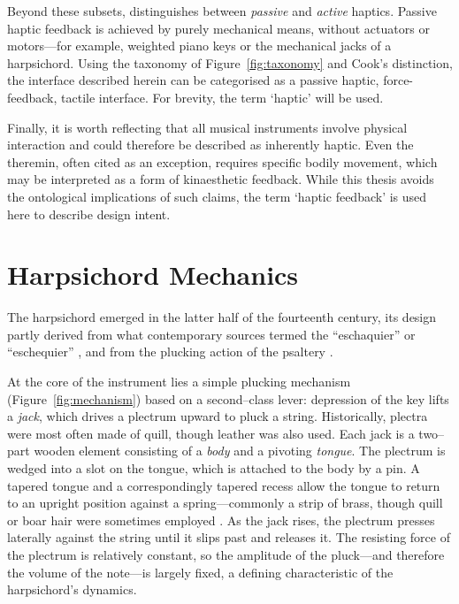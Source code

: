 Beyond these subsets, \textcite{cook_remutualizing_2004} distinguishes between \emph{passive} and \emph{active} haptics. Passive haptic feedback is achieved by purely mechanical means, without actuators or motors---for example, weighted piano keys or the mechanical jacks of a harpsichord. Using the taxonomy of Figure~\ref{fig:taxonomy} and Cook’s distinction, the interface described herein can be categorised as a passive haptic, force-feedback, tactile interface. For brevity, the term `haptic' will be used.  

Finally, it is worth reflecting that all musical instruments involve physical interaction and could therefore be described as inherently haptic. Even the theremin, often cited as an exception, requires specific bodily movement, which may be interpreted as a form of kinaesthetic feedback. While this thesis avoids the ontological implications of such claims, the term `haptic feedback' is used here to describe design intent.  

\section{Harpsichord Mechanics}

The harpsichord emerged in the latter half of the fourteenth century, its design partly derived from what contemporary sources termed the ``eschaquier'' or ``eschequier'' \cite{koster_keyboard_1994,dewhirst_stringed_2016}, and from the plucking action of the psaltery \cite{campbell_musician_1987}.  

At the core of the instrument lies a simple plucking mechanism (Figure~\ref{fig:mechanism}) based on a second–class lever: depression of the key lifts a \emph{jack}, which drives a plectrum upward to pluck a string. Historically, plectra were most often made of quill, though leather was also used.  Each jack is a two–part wooden element consisting of a \emph{body} and a pivoting \emph{tongue}. The plectrum is wedged into a slot on the tongue, which is attached to the body by a pin. A tapered tongue and a correspondingly tapered recess allow the tongue to return to an upright position against a spring---commonly a strip of brass, though quill or boar hair were sometimes employed \cite{tagliavini_clavicembali_1987}.  As the jack rises, the plectrum presses laterally against the string until it slips past and releases it. The resisting force of the plectrum is relatively constant, so the amplitude of the pluck---and therefore the volume of the note---is largely fixed, a defining characteristic of the harpsichord’s dynamics.

